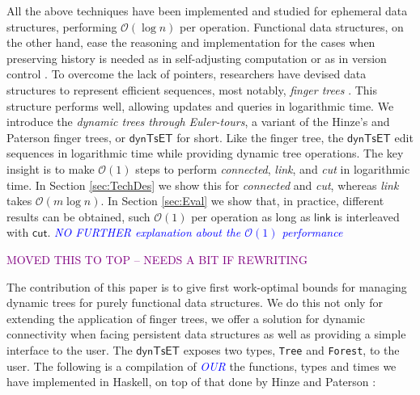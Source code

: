 \documentclass{elsarticle}
\newcommand{\tcb} [1]{\emph{\textcolor{blue}{#1}}}
\newcommand{\madd}[1]{\textcolor{Purple}{#1}}
\newcommand{\MATHSF}[1]{\ensuremath{\mathsf{#1}}\xspace}
\newcommand{\link}{\MATHSF{link}}
\newcommand{\cut}{\MATHSF{cut}}
\newcommand{\dyntset}{\MATHSF{dynTsET}}
\renewcommand{\O}{\ensuremath{\mathcal{O}}}
\begin{document}
All the above techniques have been implemented and studied for ephemeral data structures, performing $\O(\log n)$ per operation. Functional data structures, on the other hand, ease the reasoning and implementation for the cases when preserving history is needed as in self-adjusting computation \cite{DynamizingAlgos} or as in version control \cite{CVS-Demaine}. To overcome the lack of pointers, researchers have devised data structures to represent efficient sequences, most notably, \textit{finger trees} \cite{FTs}. This structure performs well, allowing updates and queries in logarithmic time. We introduce the \emph{dynamic trees through Euler-tours}, a variant of the Hinze's and Paterson finger trees, or \dyntset for short. Like the finger tree, the \dyntset edit sequences in logarithmic time while providing dynamic tree operations. The key insight is to make $\O(1)$ steps to perform \textit{connected}, \textit{link}, and \textit{cut} in logarithmic time. In Section \ref{sec:TechDes} we show this for \textit{connected} and \textit{cut}, whereas \textit{link} takes $\O(m \log n)$. In Section \ref{sec:Eval} we show that, in practice, different results can be obtained, such $\O(1)$ per operation as long as \link is interleaved with \cut.
 \tcb{NO FURTHER explanation about the $\O(1)$ performance}

\madd{MOVED THIS TO TOP -- NEEDS A BIT IF REWRITING}

The contribution of this paper is to give first work-optimal bounds for managing dynamic trees for purely functional data structures. We do this not only for extending the application of finger trees, we offer a solution for dynamic connectivity when facing persistent data structures as well as providing a simple interface to the user. The \dyntset exposes two types, \texttt{Tree} and \texttt{Forest}, to the user. The following is a compilation of \tcb{OUR} the functions, types and times we have implemented in Haskell, on top of that done by Hinze and Paterson \cite{FTs}:
\end{document}

